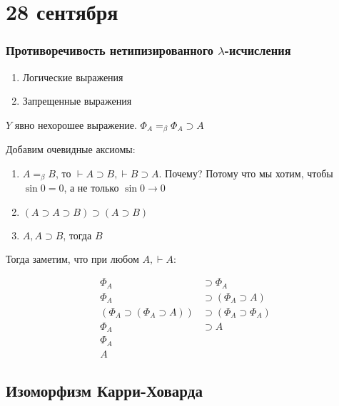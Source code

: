 \chapter{28 сентября}

\subsection{Противоречивость нетипизированного \(\lambda\)-исчисления}

\?

\begin{enumerate}
    \item Логические выражения
    \item Запрещенные выражения
\end{enumerate}

\(Y\) явно нехорошее выражение. \(\Phi_A =_\beta \Phi_A \supset A\)

Добавим очевидные аксиомы:
\begin{enumerate}
    \item \(A =_\beta B\), то \( \vdash A \supset B, \vdash B \supset A\). Почему? Потому что мы хотим, чтобы \(\sin 0 = 0\), а не только \(\sin 0 \to 0\)
    \item \((A \supset A \supset B) \supset (A \supset B)\)
    \item \(A, A \supset B\), тогда \(B\)
\end{enumerate}

Тогда заметим, что при любом \(A, \vdash A\):

\begin{align*}
    \Phi_A                              & \supset \Phi_A                  \\
    \Phi_A                              & \supset (\Phi_A \supset A)      \\
    (\Phi_A \supset (\Phi_A \supset A)) & \supset (\Phi_A \supset \Phi_A) \\
    \Phi_A                              & \supset A                       \\
    \Phi_A                                                                \\
    A
\end{align*}

\section{Изоморфизм Карри-Ховарда}

